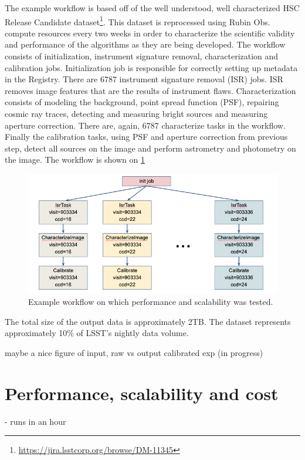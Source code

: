 \documentclass[a4paper, 10pt, conference]{ieeeconf}
\begin{document}
The example workflow is based off of the well understood, well characterized HSC Release Candidate dataset\footnote{\url{https://jira.lsstcorp.org/browse/DM-11345}}. This dataset is reprocessed using Rubin Obs. compute resources every two weeks in order to characterize the scientific validity and performance of the algorithms as they are being developed. The workflow consists of initialization, instrument signature removal, characterization and calibration jobs. Initialization job is responsible for correctly setting up metadata in the Registry. There are 6787 instrument signature removal (ISR) jobs. ISR removes image features that are the results of instrument flaws. Characterization consists of modeling the background, point spread function (PSF), repairing cosmic ray traces, detecting and measuring bright sources and measuring aperture correction. There are, again, 6787 characterize tasks in the workflow. Finally the calibration tasks, using PSF and aperture correction from previous step, detect all sources on the image and perform astrometry and photometry on the image. The workflow is shown on \ref{fig:demo-workflow}

\begin{figure}[htb]
\centering
\includegraphics[width=\columnwidth]{figures/demo-workflow.png}
\caption{Example workflow on which performance and scalability was tested.}
\label{fig:demo-workflow}
\end{figure}

The total size of the output data is approximately 2TB. The dataset represents approximately 10\% of LSST's nightly data volume. 

maybe a nice figure of input, raw vs output calibrated exp (in progress)

\section{Performance, scalability and cost}
 - runs in an hour
 
\end{document}
